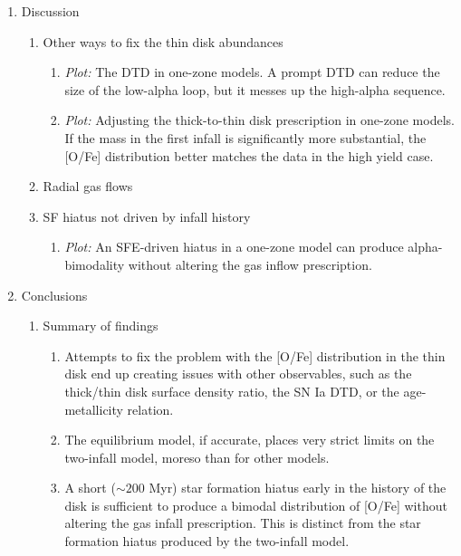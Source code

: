 \begin{enumerate}
    \item Discussion
    \begin{enumerate}
        \item Other ways to fix the thin disk abundances
        \begin{enumerate}
            \item {\it Plot:} The DTD in one-zone models. A prompt DTD can reduce the size of the low-alpha loop, but it messes up the high-alpha sequence.
            \item {\it Plot:} Adjusting the thick-to-thin disk prescription in one-zone models. If the mass in the first infall is significantly more substantial, the [O/Fe] distribution better matches the data in the high yield case.
        \end{enumerate}
        \item Radial gas flows
        \item SF hiatus not driven by infall history
        \begin{enumerate}
            \item {\it Plot:} An SFE-driven hiatus in a one-zone model can produce alpha-bimodality without altering the gas inflow prescription.
        \end{enumerate}
    \end{enumerate}
    
    \item Conclusions
    \begin{enumerate}
        \item Summary of findings
        \begin{enumerate}
            \item Attempts to fix the problem with the [O/Fe] distribution in the thin disk end up creating issues with other observables, such as the thick/thin disk surface density ratio, the SN Ia DTD, or the age-metallicity relation.
            \item The equilibrium model, if accurate, places very strict limits on the two-infall model, moreso than for other models.
            \item A short ($\sim200$ Myr) star formation hiatus early in the history of the disk is sufficient to produce a bimodal distribution of [O/Fe] without altering the gas infall prescription. This is distinct from the star formation hiatus produced by the two-infall model.
        \end{enumerate}
    \end{enumerate}
\end{enumerate}